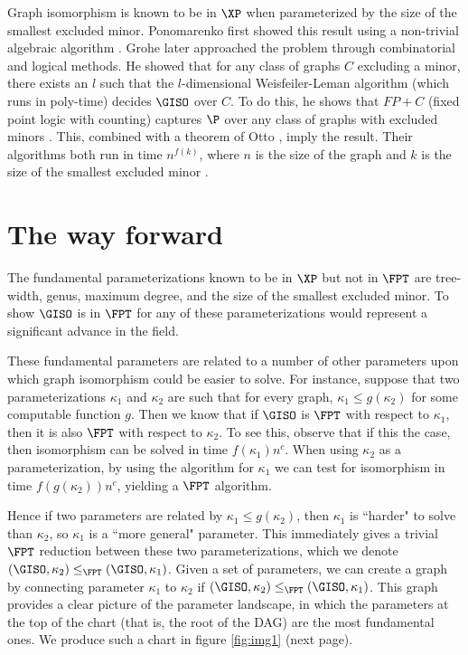\documentclass[11pt]{report}
\begin{document}
Graph isomorphism is known to be in $\XP$ when parameterized by the size of the smallest excluded minor. Ponomarenko first showed this result using a non-trivial algebraic algorithm \cite{Ponomarenko88}. Grohe later approached the problem through combinatorial and logical methods. He showed that for any class of graphs $C$ excluding a minor, there exists an $l$ such that the $l$-dimensional Weisfeiler-Leman algorithm (which runs in poly-time) decides $\GISO$ over $C$. To do this, he shows that $FP+C$ (fixed point logic with counting) captures $\P$ over any class of graphs with excluded minors \cite{Grohe10}. This, combined with a theorem of Otto \cite{Otto97}, imply the result. Their algorithms both run in time $n^{f(k)}$, where $n$ is the size of the graph and $k$ is the size of the smallest excluded minor \cite{Grohe10}.









\section{The way forward}

The fundamental parameterizations known to be in $\XP$ but not in $\FPT$ are tree-width, genus, maximum degree, and the size of the smallest excluded minor. To show $\GISO$ is in $\FPT$ for any of these parameterizations would represent a significant advance in the field. 

These fundamental parameters are related to a number of other parameters upon which graph isomorphism could be easier to solve. For instance, suppose that two parameterizations $\kappa _1$ and $\kappa_2$ are such that for every graph, $\kappa _1 \leq g(\kappa _2)$ for some computable function $g$. Then we know that if $\GISO$ is $\FPT$ with respect to $\kappa _1$, then it is also $\FPT$ with respect to $\kappa_2$. To see this, observe that if this the case, then isomorphism can be solved in time $f(\kappa_1)n^c$. When using $\kappa_2$ as a parameterization, by using the algorithm for $\kappa_1$ we can test for isomorphism in time $f(g(\kappa_2))n^c$, yielding a $\FPT$ algorithm.


Hence if two parameters are related by  $\kappa _1 \leq g(\kappa _2)$, then $\kappa _1$ is ``harder" to solve than $\kappa_2$, so $\kappa_1$ is a ``more general" parameter. This immediately gives a trivial $\FPT$ reduction between these two parameterizations, which we denote $(\GISO, \kappa_2 ) \leq_{\FPT} (\GISO, \kappa_1)$. Given a set of parameters, we can create a graph by connecting parameter $\kappa_1$ to $\kappa_2$ if $(\GISO, \kappa_2 ) \leq_{\FPT} (\GISO, \kappa_1)$. This graph provides a clear picture of the parameter landscape, in which the parameters at the top of the chart (that is, the root of the DAG) are the most fundamental ones. We produce such a chart in figure \ref{fig:img1} (next page).
\end{document}
